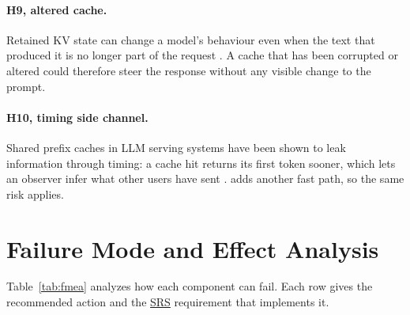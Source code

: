 \documentclass{article}
\newcommand{\srs}{\href{https://tandemkv.github.io/Tandem/SRS-Volere/SRS.pdf}{SRS}}
\begin{document}
\paragraph{H9, altered cache.} Retained KV state can change a model's
behaviour even when the text that produced it is no longer part of the
request \cite{Zhang2026Aborted}. A cache that has been corrupted or altered
could therefore steer the response without any visible change to the
prompt.

\paragraph{H10, timing side channel.} Shared prefix caches in LLM serving
systems have been shown to leak information through timing: a cache hit
returns its first token sooner, which lets an observer infer what other
users have sent \cite{Song2024EarlyBird}. \progname{} adds another fast
path, so the same risk applies.

\section{Failure Mode and Effect Analysis}
\label{sec:fmea}

Table~\ref{tab:fmea} analyzes how each component can fail. Each row gives
the recommended action and the \srs{} requirement that implements it.
\end{document}
